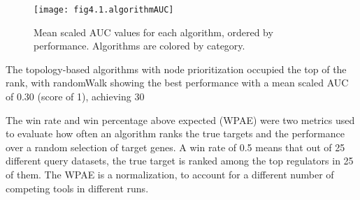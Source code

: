 \begin{figure}[htbp]
    \centering
    \texttt{[image: fig4.1.algorithmAUC]}
    \caption[Mean scaled AUC values for each algorithm.]{Mean scaled AUC values for each algorithm, ordered by performance. Algorithms are colored by category.}
    \label{fig:fig4.1.algorithmAUC}
\end{figure}

The topology-based algorithms with node prioritization occupied the top of the rank, with randomWalk showing the best performance with a mean scaled AUC of 0.30 (score of 1), achieving 30%

The win rate and win percentage above expected (WPAE) were two metrics used to evaluate how often an algorithm ranks the true targets and the performance over a random selection of target genes. A win rate of 0.5 means that out of 25 different query datasets, the true target is ranked among the top regulators in 25 of them. The WPAE is a normalization, to account for a different number of competing tools in different runs. 

